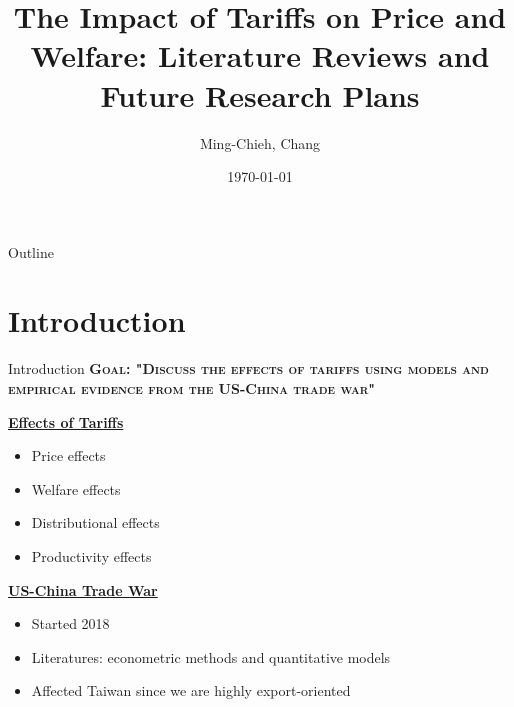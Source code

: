 \documentclass{beamer}
\title[]{The Impact of Tariffs on Price and Welfare: Literature Reviews and Future Research Plans}
\author[]{Ming-Chieh, Chang}
\institute{National Taiwan University}
\date{\today}
\begin{document}
\begin{frame}
    \titlepage 
\end{frame}

\begin{frame}{Outline}
    \tableofcontents
\end{frame}

\section{Introduction}
\begin{frame}{Introduction}
    \textbf{\textsc{Goal: "Discuss the effects of tariffs using models and empirical evidence from the US-China trade war"}} \\ 
    
    \vspace{3mm}
    
    \underline{\textbf{Effects of Tariffs}}
    \begin{itemize}
        \item Price effects
        \item Welfare effects
        \item Distributional effects
        \item Productivity effects
    \end{itemize}

    \vspace{3mm}

    \underline{\textbf{US-China Trade War}}
    \begin{itemize}
        \item Started 2018
        \item Literatures: econometric methods and quantitative models
        \item Affected {\color{red}Taiwan} since we are highly {\color{red}export-oriented}
    \end{itemize}
\end{frame}
\end{document}
